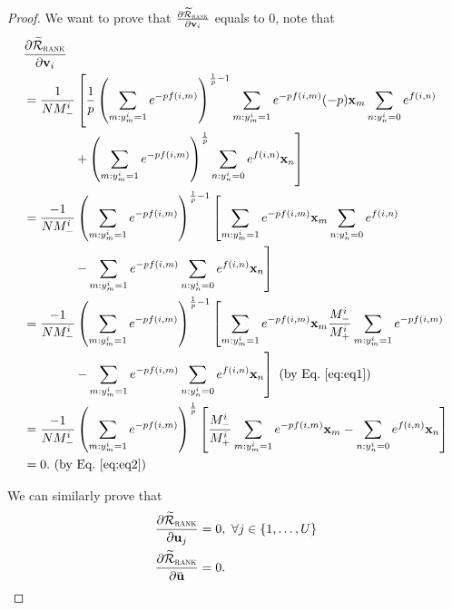 \begin{proof}
We want to prove that
$\frac{\partial \widetilde{\mathcal{R}}_\textsc{rank}} {\partial \mathbf{v}_i}$ equals to $0$, note that
\begin{equation*}
\begin{aligned}
&\frac{\partial \widetilde{\mathcal{R}}_\textsc{rank}} {\partial \mathbf{v}_i} \\
&= \frac{1}{N M_-^i} \left[ \frac{1}{p} 
   \left( \sum_{m: y_m^i=1} e^{-p f(i, m)} \right)^{\frac{1}{p} - 1} \sum_{m: y_m^i=1} e^{-p f(i, m)} (-p) \mathbf{x}_m \sum_{n: y_n^i=0} e^{f(i, n)} \right. \\
& \hspace{4em} \left.
   + \left( \sum_{m: y_m^i = 1} e^{-p f(i, m)} \right)^\frac{1}{p} \sum_{n: y_n^i = 0} e^{f(i, n)} \mathbf{x}_n \right] \\
&= \frac{-1}{N M_-^i} \left( \sum_{m: y_m^i=1} e^{-p f(i, m)} \right)^{\frac{1}{p} - 1} 
   \left[ \sum_{m: y_m^i=1} e^{-p f(i, m)} \mathbf{x}_m \sum_{n: y_n^i=0} e^{f(i, n)} \right. \\
& \hspace{4em} \left.
   - \sum_{m: y_m^i = 1} e^{-p f(i, m)} \sum_{n: y_n^i = 0} e^{f(i, n)} \mathbf{x}_n \right] \\
&= \frac{-1}{N M_-^i} \left( \sum_{m: y_m^i=1} e^{-p f(i, m)} \right)^{\frac{1}{p} - 1} 
   \left[ \sum_{m: y_m^i=1} e^{-p f(i, m)} \mathbf{x}_m \frac{M_-^i}{M_+^i} \sum_{m: y_m^i=1} e^{-p f(i, m)} \right. \\
& \hspace{4em} \left.
   - \sum_{m: y_m^i = 1} e^{-p f(i, m)} \sum_{n: y_n^i = 0} e^{f(i, n)} \mathbf{x}_n \right] \ \text{(by Eq.~\ref{eq:eq1})} \\
&= \frac{-1}{N M_-^i} \left( \sum_{m: y_m^i=1} e^{-p f(i, m)} \right)^\frac{1}{p} 
   \left[ \frac{M_-^i}{M_+^i} \sum_{m: y_m^i=1} e^{-p f(i, m)} \mathbf{x}_m - \sum_{n: y_n^i = 0} e^{f(i, n)} \mathbf{x}_n \right] \\
&= 0. \ \text{(by Eq.~\ref{eq:eq2})}
\end{aligned}
\end{equation*}

We can similarly prove that 
\begin{equation*}
\begin{aligned}
\frac{\partial \widetilde\RCal_\textsc{rank}}{\partial \bu_j} &= 0, \ \forall j \in \{1,\dots,U\} \\
\frac{\partial \widetilde\RCal_\textsc{rank}}{\partial \widebar{\bu}} &= 0.
\end{aligned}
\end{equation*}

\end{proof}

